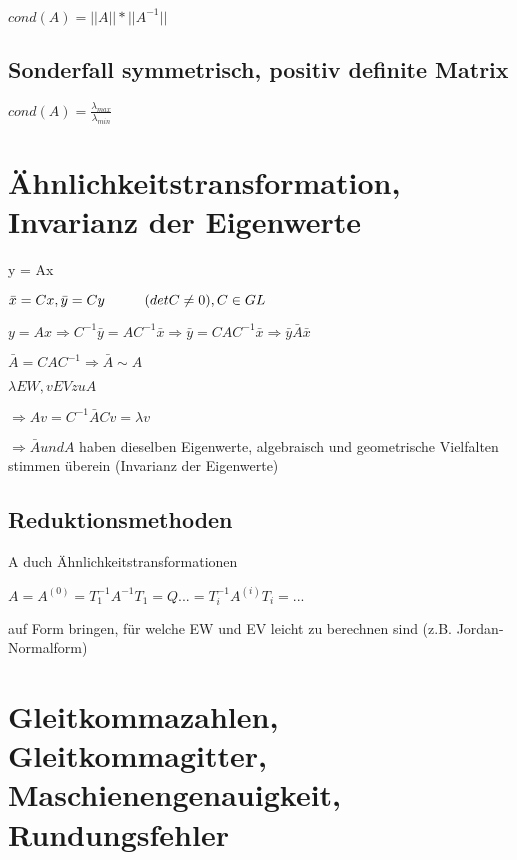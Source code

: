 \documentclass[12pt,a4paper]{article} %
\newcommand*\conj[1]{\bar{#1}}
\newcommand\tab[1][1cm]{\hspace*{#1}}
\begin{document}
		$cond(A) = ||A||*||A^{-1}||$
		
		\subsection{Sonderfall symmetrisch, positiv definite Matrix}
		
		$cond(A) = \frac{ \lambda_{max}}{ \lambda_{min}}$
		
		\newpage
		
		\section{Ähnlichkeitstransformation, Invarianz der Eigenwerte}
		
		y = Ax
		
		$\conj{x} = Cx, \conj{y} = Cy \tab (det C \ne 0), C \in GL$ 
		
		$y = Ax \Rightarrow C^{-1} \conj{y} = AC^{-1} \conj{x} \Rightarrow \conj{y} = CAC^{-1} \conj{x} \Rightarrow \conj{y}\conj{A}\conj{x}$
		
		$\conj{A} = CAC^{-1} \Rightarrow \conj{A} \sim A$
		
		$\lambda EW, v EV zu A$
		
		$\Rightarrow Av = C^{-1}\conj{A}Cv = \lambda v$
		
		$\Rightarrow \conj{A} und A $ haben dieselben Eigenwerte, algebraisch und geometrische Vielfalten stimmen überein (Invarianz der Eigenwerte)
		
		\subsection{Reduktionsmethoden}
		
		A duch Ähnlichkeitstransformationen 
		
		$A = A^{(0)} = T_1^{-1} A^{-1}T_1 = Q ... = T_i^{-1}A^{(i)}T_i = ...$
		
		auf Form bringen, für welche EW und EV leicht zu berechnen sind (z.B. Jordan-Normalform)
		
		\newpage
		
		\section[Gleitkommazahlen]{Gleitkommazahlen, Gleitkommagitter, Maschienengenauigkeit, Rundungsfehler}
		
		
		
		
\end{document}
